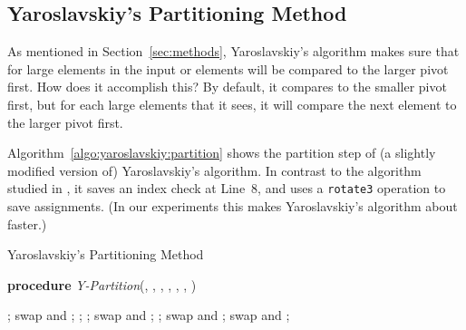 \documentclass[prodmode,acmtalg]{acmsmall}
\begin{document}
\subsection{Yaroslavskiy's Partitioning Method}\label{app:sec:yaroslavskiy}
As mentioned in Section~\ref{sec:methods}, Yaroslavskiy's algorithm makes sure that for
 large elements in the input  or  elements will be compared to
the larger pivot first. How does it accomplish this? By default, it
compares to the smaller pivot first, but for each large
elements that it sees, it will compare the next element to the larger pivot
first.

Algorithm~\ref{algo:yaroslavskiy:partition} shows the partition step of (a slightly modified version of) 
Yaroslavskiy's algorithm. In contrast to the algorithm
studied in \cite{nebel12}, it saves an index check at Line~8, and uses a \texttt{rotate3} operation
to save assignments. (In our experiments this makes Yaroslavskiy's algorithm about  faster.)

\begin{algorithm}
    \caption{Yaroslavskiy's Partitioning Method}\samepage\label{algo:yaroslavskiy:partition}
		\textbf{procedure} \textit{Y-Partition}(, , , ,
		, , )
    \begin{algorithmic}[1]
		\State ;
                \While{}
                    \If{}
                        \State swap  and ;
                        \State ;
                    \Else
                        \If{}
                            \While{} 
                                \State ;
                            \EndWhile
                            \If{}
                                \If{}
                                    \State 
                                    \State 
                                \Else
                                    \State swap  and ;
                                \EndIf
                                \State 
                            \EndIf
                        \EndIf
                    \EndIf
                    \State ;
		\EndWhile
                \State swap  and ;
		\State swap   and ;
	        \State 
    \end{algorithmic}
\end{algorithm}
\end{document}
